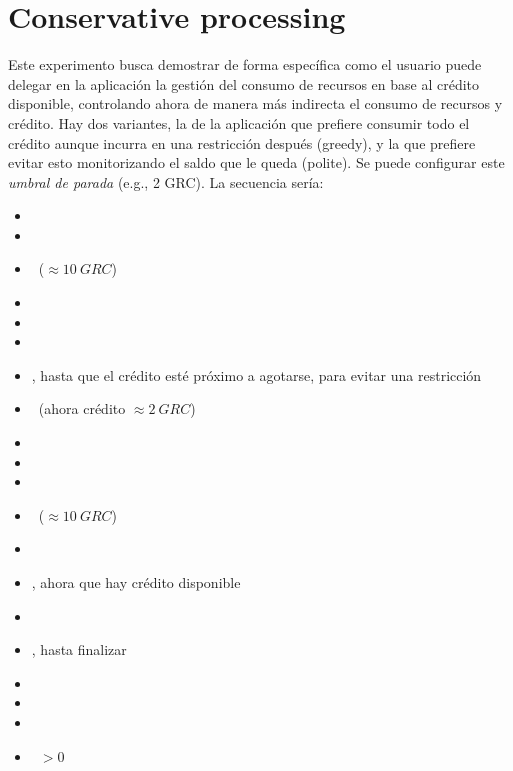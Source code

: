 \documentclass[preprint,3p]{elsarticle}
\begin{document}
\newpage
\section{Conservative processing}

\noindent 
Este experimento busca demostrar de forma específica como el usuario puede delegar en la aplicación la gestión del consumo de recursos en base al crédito disponible, controlando ahora de manera más indirecta el consumo de recursos y crédito. Hay dos variantes, la de la aplicación que prefiere consumir todo el crédito aunque incurra en una restricción después (greedy), y la que prefiere evitar esto monitorizando el saldo que le queda (polite). Se puede configurar este \textit{umbral de parada} (e.g., 2 GRC). La secuencia sería:

\begin{itemize}
	\setlength\itemsep{0em}
	\item \UserNoCredit
	\item \UserSendsSomeTasks
	\item \UserSendsCredit~($\approx 10~GRC$)
	\item \ContainerUp
	\item \AppStart
	\item \ServerlessAdapts
	\item \AppRuns, hasta que el crédito esté próximo a agotarse, para evitar una restricción
	\item \AppWaits~(ahora crédito $\approx 2~GRC$)
	\item \ServerlessDown
	\item \AccountingIdle
	\item \Wait
	\item \UserSendsCredit~($\approx 10~GRC$)
	\item \UserSendsSomeTasks
	\item \AppRuns, ahora que hay crédito disponible
	\item \ServerlessAdapts
	\item \AppRuns, hasta finalizar
	\item \ServerlessDown
	\item \AccountingIdle
	\item \ContainerTimeout
	\item \AccountingCredit~$> 0$
\end{itemize}







\end{document}
